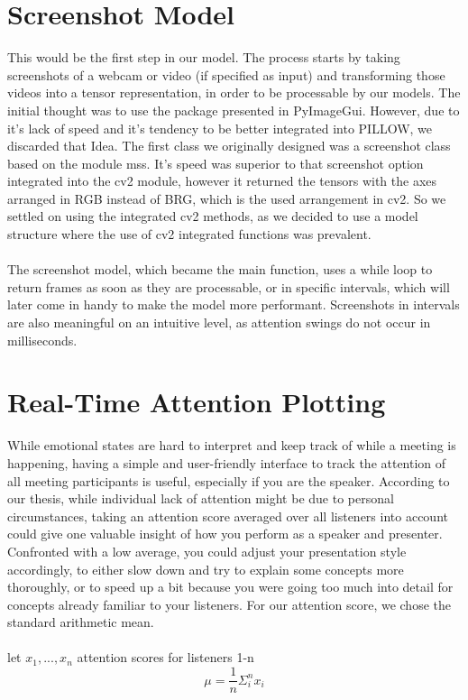 \documentclass{article}
\begin{document}
\section{Screenshot Model}
This would be the first step in our model. The process starts by taking screenshots of a webcam or video (if specified as input) and transforming those videos into a tensor representation, in order to be processable by our models. The initial thought was to use the package presented in PyImageGui. However, due to it’s lack of speed and it’s tendency to be better integrated into PILLOW, we discarded that Idea. The first class we originally designed was a screenshot class based on the module mss. It’s speed was superior to that screenshot option integrated into the cv2 module, however it returned the tensors with the axes arranged in RGB instead of BRG, which is the used arrangement in cv2. So we settled on using the integrated cv2 methods, as we decided to use a model structure where the use of cv2 integrated functions was prevalent.
\\\\
The screenshot model, which became the main function, uses a while loop to return frames as soon as they are processable, or in specific intervals, which will later come in handy to make the model more performant. Screenshots in intervals are also meaningful on an intuitive level, as attention swings do not occur in milliseconds.

\section{Real-Time Attention Plotting}

While emotional states are hard to interpret and keep track of while a meeting is happening, having a simple and user-friendly interface to track the attention of all meeting participants is useful, especially if you are the speaker. According to our thesis, while individual lack of attention might be due to personal circumstances, taking an attention score averaged over all listeners into account could give one valuable insight of how you perform as a speaker and presenter. Confronted with a low average, you could adjust your presentation style accordingly, to either slow down and try to explain some concepts more thoroughly, or to speed up a bit because you were going too much into detail for concepts already familiar to your listeners. For our attention score, we chose the standard arithmetic mean.\\
\\
let $ x_1,...,x_n$ attention scores for listeners 1-n
\begin{equation}
\mu = \frac{1}{n}\Sigma_{i}^{n}x_i
\end{equation}
\end{document}

